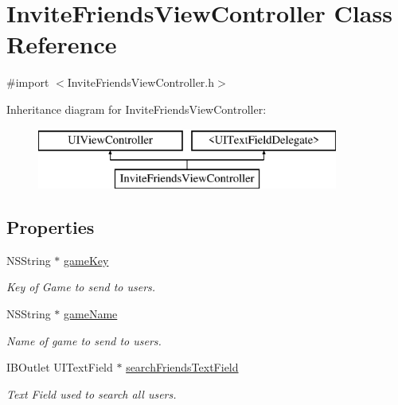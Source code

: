 \hypertarget{interface_invite_friends_view_controller}{\section{Invite\+Friends\+View\+Controller Class Reference}
\label{interface_invite_friends_view_controller}
}


{\ttfamily \#import $<$Invite\+Friends\+View\+Controller.\+h$>$}

Inheritance diagram for Invite\+Friends\+View\+Controller\+:\begin{figure}[H]
\begin{center}
\leavevmode
\includegraphics[height=2.000000cm]{interface_invite_friends_view_controller}
\end{center}
\end{figure}
\subsection*{Properties}
\begin{DoxyCompactItemize}
\item 
\hypertarget{interface_invite_friends_view_controller_aabedef0629298f77f1d038a141fd8654}{N\+S\+String $\ast$ \hyperlink{interface_invite_friends_view_controller_aabedef0629298f77f1d038a141fd8654}{game\+Key}}\label{interface_invite_friends_view_controller_aabedef0629298f77f1d038a141fd8654}

\begin{DoxyCompactList}\small\item\em Key of Game to send to users. \end{DoxyCompactList}\item 
\hypertarget{interface_invite_friends_view_controller_a60973f5161bd9f6ebf8ab7d48f65ba49}{N\+S\+String $\ast$ \hyperlink{interface_invite_friends_view_controller_a60973f5161bd9f6ebf8ab7d48f65ba49}{game\+Name}}\label{interface_invite_friends_view_controller_a60973f5161bd9f6ebf8ab7d48f65ba49}

\begin{DoxyCompactList}\small\item\em Name of game to send to users. \end{DoxyCompactList}\item 
\hypertarget{interface_invite_friends_view_controller_aefa920c58e38d646330be8aeeb47c63b}{I\+B\+Outlet U\+I\+Text\+Field $\ast$ \hyperlink{interface_invite_friends_view_controller_aefa920c58e38d646330be8aeeb47c63b}{search\+Friends\+Text\+Field}}\label{interface_invite_friends_view_controller_aefa920c58e38d646330be8aeeb47c63b}

\begin{DoxyCompactList}\small\item\em Text Field used to search all users. \end{DoxyCompactList}\end{DoxyCompactItemize}


